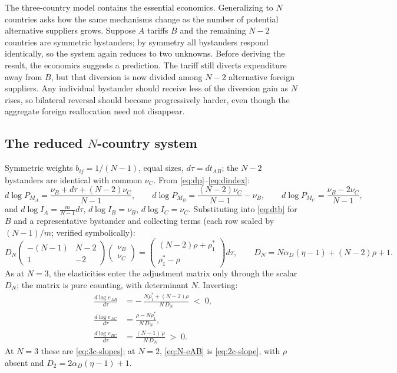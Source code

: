 \documentclass[11pt]{article}
\begin{document}
The three-country model contains the essential economics. Generalizing to $N$ countries asks how the same mechanisms change as the number of potential alternative suppliers grows. Suppose $A$ tariffs $B$ and the remaining $N-2$ countries are symmetric bystanders; by symmetry all bystanders respond identically, so the system again reduces to two unknowns. Before deriving the result, the economics suggests a prediction. The tariff still diverts expenditure away from $B$, but that diversion is now divided among $N-2$ alternative foreign suppliers. Any individual bystander should receive less of the diversion gain as $N$ rises, so bilateral reversal should become progressively harder, even though the aggregate foreign reallocation need not disappear.

\subsection{The reduced $N$-country system}

Symmetric weights $b_{ij} = 1/(N-1)$, equal sizes, $d\tau = dt_{AB}$; the $N-2$ bystanders are identical with common $\nu_C$. From \eqref{eq:dp}--\eqref{eq:dindex}:
\begin{equation}
d\log P_{M_A} = \frac{\nu_B + d\tau + (N-2)\nu_C}{N-1},
\qquad
d\log P_{M_B} = \frac{(N-2)\nu_C}{N-1} - \nu_B,
\qquad
d\log P_{M_C} = \frac{\nu_B - 2\nu_C}{N-1},
\label{eq:N-indices}
\end{equation}
and $d\log I_A = \tfrac{m}{N-1}d\tau$, $d\log I_B = \nu_B$, $d\log I_C = \nu_C$. Substituting into \eqref{eq:dtb} for $B$ and a representative bystander and collecting terms (each row scaled by $(N-1)/m$; verified symbolically):
\begin{equation}
D_N
\begin{pmatrix} -(N-1) & N-2 \\ 1 & -2 \end{pmatrix}
\begin{pmatrix} \nu_B \\ \nu_C \end{pmatrix}
=
\begin{pmatrix} (N-2)\rho + \rho_1^* \\ \rho_1^* - \rho \end{pmatrix} d\tau ,
\qquad
D_N = N\alpha_D(\eta-1) + (N-2)\rho + 1 .
\label{eq:N-system}
\end{equation}
As at $N=3$, the elasticities enter the adjustment matrix only through the scalar $D_N$; the matrix is pure counting, with determinant $N$. Inverting:
\begin{align}
\frac{d\log e_{AB}}{d\tau}
&= -\,\frac{N\rho_1^* + (N-2)\rho}{N\, D_N} \;<\; 0,
\label{eq:N-eAB}\\[3pt]
\frac{d\log e_{AC}}{d\tau}
&= \frac{\rho - N\rho_1^*}{N\, D_N},
\label{eq:N-eAC}\\[3pt]
\frac{d\log e_{BC}}{d\tau}
&= \frac{(N-1)\,\rho}{N\, D_N} \;>\; 0 .
\label{eq:N-eBC}
\end{align}
At $N = 3$ these are \eqref{eq:3c-slopes}; at $N = 2$, \eqref{eq:N-eAB} is \eqref{eq:2c-slope}, with $\rho$ absent and $D_2 = 2\alpha_D(\eta-1)+1$.
\end{document}
